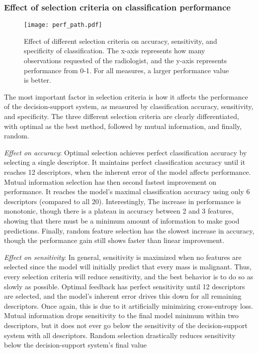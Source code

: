  \subsubsection{Effect of selection criteria on classification performance}

 
 \begin{figure}[h]
 	\centering
 	\texttt{[image: perf\_path.pdf]}
 	\caption[Effect of selection criteria on classification performance]{Effect of different selection criteria on accuracy, sensitivity, and specificity of classification. The x-axis represents how many observations requested of the radiologist, and the y-axis represents performance from 0-1. For all measures, a larger performance value is better.}
 	\label{fig:feedback_performance}
 \end{figure}

The most important factor in selection criteria is how it affects the performance of the decision-support system, as measured by classification accuracy, sensitivity, and specificity. The three different selection criteria are clearly differentiated, with optimal as the best method, followed by mutual information, and finally, random.

\emph{Effect on accuracy}: 
Optimal selection achieves perfect classification accuracy by selecting a single descriptor. It maintains perfect classification accuracy until it reaches 12 descriptors, when the inherent error of the model affects performance. Mutual information selection has then second fastest improvement on performance. It reaches the model's maximal classification accuracy using only 6 descriptors (compared to all 20). Interestingly, The increase in performance is monotonic, though there is a plateau in accuracy between 2 and 3 features, showing that there must be a minimum amount of information to make good predictions. Finally, random feature selection has the slowest increase in accuracy, though the performance gain still shows faster than linear improvement.

\emph{Effect on sensitivity}:
In general, sensitivity is maximized when no features are selected since the model will initially predict that every mass is malignant. Thus, every selection criteria will reduce sensitivity, and the best behavior is to do so as slowly as possible. Optimal feedback has perfect sensitivity until 12 descriptors are selected, and the model's inherent error drives this down for all remaining descriptors. Once again, this is due to it artificially minimizing cross-entropy loss. Mutual information drops sensitivity to the final model minimum within two descriptors, but it does not ever go below the sensitivity of the decision-support system with all descriptors. Random selection drastically reduces sensitivity below the decision-support system's final value

